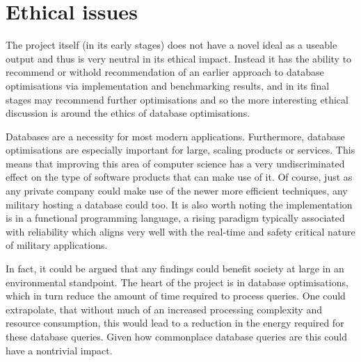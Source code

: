 \chapter{Ethical issues} %
\begin{comment}
What are the wider ethical, legal, professional and societal issues surrounding your project and the accompanying research? You should use the ethics checklist as the basis for this discussion. 
\end{comment}
The project itself (in its early stages) does not have a novel ideal as a useable output and thus is very neutral in its ethical impact. Instead it has the ability to recommend or withold recommendation of an earlier approach to database optimisations via implementation and benchmarking results, and in its final stages may recommend further optimisations and so the more interesting ethical discussion is around the ethics of database optimisations.


Databases are a necessity for most modern applications. Furthermore, database optimisations are especially important for large, scaling products or services. This means that improving this area of computer science has a very undiscriminated effect on the type of software products that can make use of it. Of course, just as any private company could make use of the newer more efficient techniques, any military hosting a database could too. It is also worth noting the implementation is in a functional programming language, a rising paradigm  typically associated with reliability   which aligns very well with the real-time and safety critical nature of military applications. 

In fact, it could be argued that any findings could benefit society at large in an environmental standpoint. The heart of the project is in database optimisations, which in turn reduce the amount of time required to process queries.  One could extrapolate, that without much of an increased processing complexity and resource consumption, this would lead to a reduction in the energy required for these database queries. Given how commonplace database queries are  this could have a nontrivial impact.


